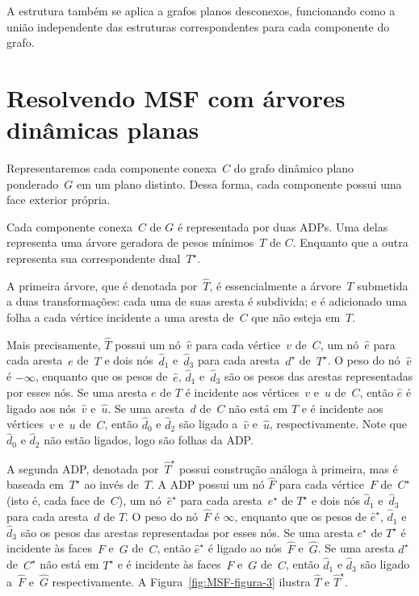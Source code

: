 A estrutura também se aplica a grafos planos desconexos, funcionando como a união independente das estruturas correspondentes para cada componente do grafo.

\section{Resolvendo MSF com árvores dinâmicas planas}

Representaremos cada componente conexa~$C$ do grafo dinâmico plano ponderado~$G$ em um plano distinto.
Dessa forma, cada componente possui uma face exterior própria.

Cada componente conexa~$C$ de $G$ é representada por duas ADPs.
Uma delas representa uma árvore geradora de pesos mínimos~$T$ de $C$.
Enquanto que a outra representa sua correspondente dual~$T^\star$.

A primeira árvore, que é denotada por~$\hat T$, é essencialmente a árvore~$T$ submetida a duas transformações: cada uma de suas aresta é subdivida; e é adicionado uma folha a cada vértice incidente a uma aresta de~$C$ que não esteja em~$T$.

Mais precisamente, $\hat T$ possui um nó~$\hat v$ para cada vértice~$v$ de~$C$, um nó~$\hat e$ para cada aresta~$e$ de~$T$ e dois nós~$\hat d_1$ e~$\hat d_3$ para cada aresta~$d^\star$ de~$T^\star$.
O peso do nó~$\hat v$ é $-\infty$, enquanto que os pesos de~$\hat e$, $\hat d_1$ e~$\hat d_3$ são os pesos das arestas representadas por esses nós. 
Se uma aresta $e$ de $T$ é incidente aos vértices~$v$ e~$u$ de~$C$, então $\hat e$ é ligado aos nós~$\hat v$ e~$\hat u$.
Se uma aresta~$d$ de~$C$ não está em $T$ e é incidente aos vértices~$v$ e~$u$ de~$C$, então $\hat d_0$ e $\hat d_2$ são ligado a~$\hat v$ e~$\hat u$, respectivamente.
Note que $\hat d_0$ e $\hat d_2$ não estão ligados, logo são folhas da ADP.

A segunda ADP, denotada por~$\hat T^\star$  possui construção análoga à primeira, mas é baseada em~$T^\star$ ao invés de~$T$.
A ADP possui um nó $\hat F$ para cada vértice~$F$ de~$C^\star$ (isto é, cada face de~$C$), um nó~$\hat e^\star$ para cada aresta~$e^\star$ de $T^\star$ e dois nós $\hat d_1$ e~$\hat d_3$ para cada aresta~$d$ de $T$.
O peso do nó~$\hat F$ é $\infty$, enquanto que os pesos de $\hat e^\star$, $\hat d_1$ e~$\hat d_3$ são os pesos das arestas representadas por esses nós.
Se uma aresta $e^\star$ de $T^\star$ é incidente às faces~$F$ e~$G$ de~$C$, então $\hat e^\star$ é ligado ao nós~$\hat F$ e~$\hat G$.
Se uma aresta $d^\star$ de~$C^\star$ não está em $T^\star$ e é incidente às faces~$F$ e~$G$ de~$C$, então $\hat d_1$ e $\hat d_3$ são ligado a~$\hat F$ e~$\hat G$ respectivamente.
A Figura~\ref{fig:MSF-figura-3} ilustra $\hat T$ e $\hat T^\star$.

